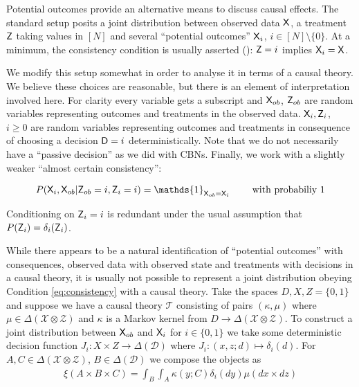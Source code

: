 Potential outcomes provide an alternative means to discuss causal effects. The standard setup posits a joint distribution between observed data $\mathsf{X}$, a treatment $\mathsf{Z}$ taking values in $[N]$ and several ``potential outcomes'' $\mathsf{X}_i$, $i\in [N]\setminus\{0\}$. At a minimum, the consistency condition is usually asserted (\cite{richardson2013single}): $\mathsf{Z}=i$ implies $\mathsf{X}_i=\mathsf{X}$. 

We modify this setup somewhat in order to analyse it in terms of a causal theory. We believe these choices are reasonable, but there is an element of interpretation involved here. For clarity every variable gets a subscript and $\mathsf{X}_{ob}$, $\mathsf{Z}_{ob}$ are random variables representing outcomes and treatments in the observed data. $\mathsf{X}_i, \mathsf{Z}_i$, $i\geq 0$ are random variables representing outcomes and treatments in consequence of choosing a decision $\mathsf{D}=i$ deterministically. Note that we do not necessarily have a ``passive decision'' as we did with CBNs. Finally, we work with a slightly weaker ``almost certain consistency'':

\begin{align}
    P(\RV{X}_i,\RV{X}_{ob}|\RV{Z}_{ob}=i,\RV{Z}_i=i)=\mathds{1}_{\RV{X}_{ob}=\RV{X}_i} \qquad\text{ with probabiliy 1}\label{eq:consistency}
\end{align}

Conditioning on $\mathsf{Z}_i=i$ is redundant under the usual assumption that $P(\mathsf{Z}_i) = \delta_i(\mathsf{Z}_i)$.

While there appears to be a natural identification of ``potential outcomes'' with consequences, observed data with observed state and treatments with decisions in a causal theory, it is usually not possible to represent a joint distribution obeying Condition \ref{eq:consistency} with a causal theory. Take the spaces $D,X,Z=\{0,1\}$ and suppose we have a causal theory $\mathscr{T}$ consisting of pairs $(\kappa,\mu)$ where $\mu\in\Delta(\mathcal{X}\otimes\mathcal{Z})$ and $\kappa$ is a Markov kernel from $D\to \Delta(\mathcal{X}\otimes\mathcal{Z})$. To construct a joint distribution between $\mathsf{X}_{ob}$ and $\mathsf{X}_i$ for $i\in \{0,1\}$ we take some deterministic decision function $J_i:X\times Z\to \Delta(\mathcal{D})$ where $J_i:(x,z;d)\mapsto \delta_i(d)$. For $A,C\in \Delta(\mathcal{X}\otimes\mathcal{Z})$, $B\in \Delta(\mathcal{D})$ we compose the objects as 
\begin{align}
    \xi(A\times B\times C) =  \int_B \int_A  \kappa(y; C) \delta_i(dy) \mu(dx\times dz)
\end{align}

